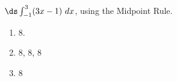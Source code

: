 {$\ds \int_{-1}^3 (3x-1)\ dx$, using the Midpoint Rule.
}
{\begin{enumerate}
\item		8.
\item		8, 8, 8
\item		$8$
\end{enumerate}
}


